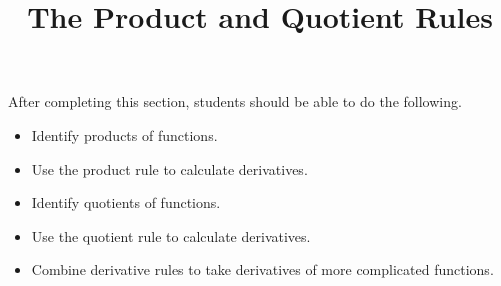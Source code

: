\documentclass{ximera}
\title{The Product and Quotient Rules}
\begin{document}
\begin{abstract}
\end{abstract}

\maketitle

\begin{sectionOutcomes}

After completing this section, students should be able to do the following.

\begin{itemize}
	\item Identify products of functions.
	\item Use the product rule to calculate derivatives.
	\item Identify quotients of functions.
	\item Use the quotient rule to calculate derivatives.
	\item Combine derivative rules to take derivatives of more complicated functions.
\end{itemize}

\end{sectionOutcomes}
\end{document}
